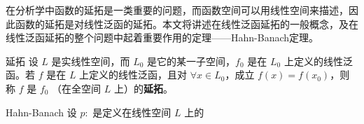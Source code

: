 
在分析学中函数的延拓是一类重要的问题，而函数空间可以用线性空间来描述，因此函数的延拓是对线性泛函的延拓。本文将讲述在线性泛函延拓的一般概念，及在线性泛函延拓的整个问题中起着重要作用的定理——Hahn-Banach定理。

\begin{definition}{延拓}
设 $L$ 是实线性空间，而 $L_0$ 是它的某一子空间，$f_0$ 是在 $L_0$ 上定义的线性泛函。若 $f$ 是在 $L$ 上定义的线性泛函，且对 $\forall x\in L_0$，成立 $f(x)=f(x_0)$，则称 $f$ 是 $f_0$ （在全空间 $L$ 上）的\textbf{延拓}。
\end{definition}


\begin{theorem}{Hahn-Banach}
设 $p:$ 是定义在线性空间 $L$ 上的
\end{theorem}



